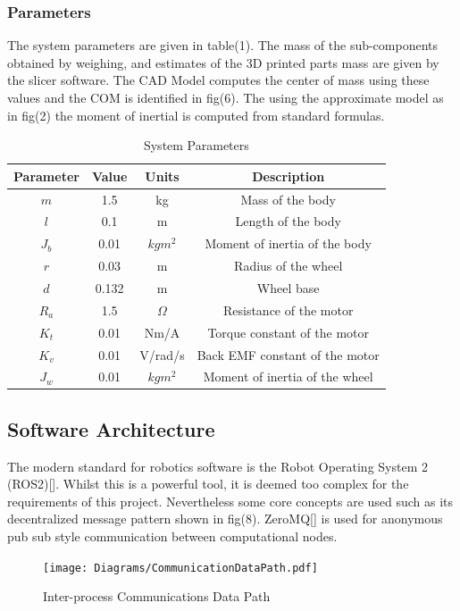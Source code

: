         \pagebreak{}
        \subsubsection{Parameters }
        The system parameters are given in table(1). 
        The mass of the sub-components obtained by weighing,
        and estimates of the 3D printed parts mass are given by the slicer software. 
        The CAD Model computes the center of mass using these values and the COM is identified in fig(6).
        The using the approximate model as in fig(2) the moment of inertial is computed from standard formulas.
        \begin{table} [H]
            \centering
            \begin{tabular}{|c|c|c|c|}
                \hline
                Parameter & Value & Units & Description \\
                \hline
                $m$ & 1.5 & kg & Mass of the body \\
                $l$ & 0.1 & m & Length of the body \\
                $J_b$ & 0.01 & $kgm^2$ & Moment of inertia of the body \\
                $r$ & 0.03 & m & Radius of the wheel \\
                $d$ & 0.132 & m & Wheel base \\
                $R_a$ & 1.5 & $\Omega$ & Resistance of the motor \\
                $K_t$ & 0.01 & Nm/A & Torque constant of the motor \\
                $K_v$ & 0.01 & V/rad/s & Back EMF constant of the motor \\
                $J_w$ & 0.01 & $kgm^2$ & Moment of inertia of the wheel \\
                \hline
            \end{tabular}
            \caption{System Parameters}
        \end{table}

        \pagebreak{}
        \subsection{Software Architecture}
        The modern standard for robotics software is the Robot Operating System 2 (ROS2)[]. 
        Whilst this is a powerful tool, it is deemed too complex for the requirements of this project.
        Nevertheless some core concepts are used such as its 
        decentralized message pattern shown in fig(8). ZeroMQ[] is used for 
        anonymous pub sub style communication between computational nodes.
        \begin{figure} [H]
            \texttt{[image: Diagrams/CommunicationDataPath.pdf]}  
            \caption{Inter-process Communications Data Path}
        \end{figure}

